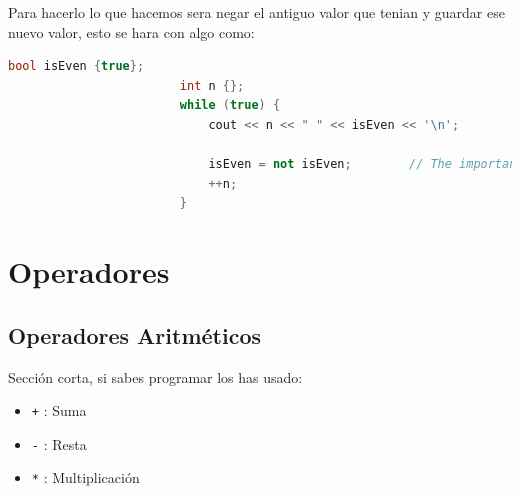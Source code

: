\documentclass[12pt, fleqn]{report}                             %
\theoremstyle{break}                                            %
\newcommand{\textCode}[1]  { \texttt{#1} }                      %
\begin{document}
                    Para hacerlo lo que hacemos sera negar el antiguo valor que tenian y guardar ese nuevo valor,
                    esto se hara con algo como:
                    \begin{lstlisting}[language=C++, gobble=24]
                        bool isEven {true};
                        int n {};
                        while (true) {
                            cout << n << " " << isEven << '\n';

                            isEven = not isEven;        // The important line
                            ++n;
                        }
                    \end{lstlisting}


        \clearpage
        \section{Operadores}

            \subsection{Operadores Aritméticos}

                Sección corta, si sabes programar los has usado:

                \begin{itemize}
                    \item \textCode{+}: Suma
                    \item \textCode{-}: Resta
                    \item \textCode{*}: Multiplicación
                \end{itemize}
\end{document}
